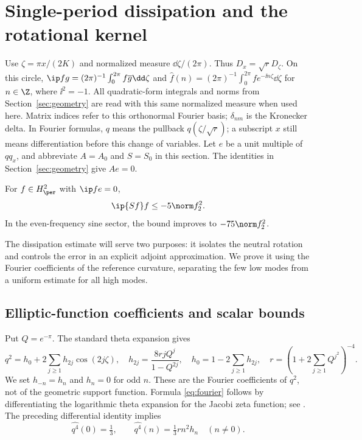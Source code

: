 \section{Single-period dissipation and the rotational kernel}\label{app:single}\label{sec:spectrum}
Use $\zeta=\pi x/(2K)$ and normalized measure $\dd\zeta/(2\pi)$. Thus $D_x=\sqrt rD_\zeta$. On this circle, $\ip f g=(2\pi)^{-1}\int_0^{2\pi}f\overline g\dd\zeta$ and $\widehat f(n)=(2\pi)^{-1}\int_0^{2\pi}f e^{-\ii n\zeta}\dd\zeta$ for $n\in\Z$, where $\ii^2=-1$. All quadratic-form integrals and norms from Section~\ref{sec:geometry} are read with this same normalized measure when used here. Matrix indices refer to this orthonormal Fourier basis; $\delta_{nm}$ is the Kronecker delta. In Fourier formulas, $q$ means the pullback $q(\zeta/\sqrt r)$; a subscript $x$ still means differentiation before this change of variables. Let $e$ be a unit multiple of $qq_x$, and abbreviate $A=A_0$ and $S=S_0$ in this section. The identities in Section~\ref{sec:geometry} give $Ae=0$.
\begin{lemma}\label{lem:coercivity}
For $f\in H^2_\per$ with $\ip f e=0$,
\begin{equation}\label{eq:coercivity}
\ip{Sf}f\le-5\norm f_2^2.
\end{equation}
In the even-frequency sine sector, the bound improves to $-75\norm f_2^2$.
\end{lemma}


The dissipation estimate will serve two purposes: it isolates the neutral rotation and controls the error in an explicit adjoint approximation. We prove it using the Fourier coefficients of the reference curvature, separating the few low modes from a uniform estimate for all high modes.

\subsection{Elliptic-function coefficients and scalar bounds}
Put $Q=e^{-\pi}$. The standard theta expansion gives
\begin{equation}\label{eq:fourier}
 q^2=h_0+2\sum_{j\ge1}h_{2j}\cos(2j\zeta),\quad
 h_{2j}=\frac{8rjQ^j}{1-Q^{2j}},\quad h_0=1-2\sum_{j\ge1}h_{2j},\quad
 r=\left(1+2\sum_{j\ge1}Q^{j^2}\right)^{-4}.
\end{equation}
We set $h_{-n}=h_n$ and $h_n=0$ for odd $n$. These are the Fourier coefficients of $q^2$, not of the geometric support function. Formula \eqref{eq:fourier} follows by differentiating the logarithmic theta expansion for the Jacobi zeta function; see \cite{DLMF}. The preceding differential identity implies
\begin{equation}\label{eq:q4}
 \widehat{q^4}(0)=\tfrac13,\qquad
 \widehat{q^4}(n)=\tfrac13rn^2h_n\quad(n\ne0).
\end{equation}

